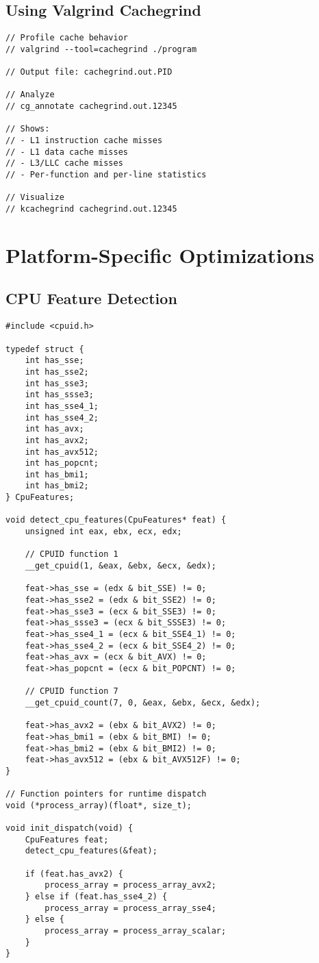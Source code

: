 \subsection{Using Valgrind Cachegrind}

\begin{lstlisting}
// Profile cache behavior
// valgrind --tool=cachegrind ./program

// Output file: cachegrind.out.PID

// Analyze
// cg_annotate cachegrind.out.12345

// Shows:
// - L1 instruction cache misses
// - L1 data cache misses
// - L3/LLC cache misses
// - Per-function and per-line statistics

// Visualize
// kcachegrind cachegrind.out.12345
\end{lstlisting}

\section{Platform-Specific Optimizations}

\subsection{CPU Feature Detection}

\begin{lstlisting}
#include <cpuid.h>

typedef struct {
    int has_sse;
    int has_sse2;
    int has_sse3;
    int has_ssse3;
    int has_sse4_1;
    int has_sse4_2;
    int has_avx;
    int has_avx2;
    int has_avx512;
    int has_popcnt;
    int has_bmi1;
    int has_bmi2;
} CpuFeatures;

void detect_cpu_features(CpuFeatures* feat) {
    unsigned int eax, ebx, ecx, edx;

    // CPUID function 1
    __get_cpuid(1, &eax, &ebx, &ecx, &edx);

    feat->has_sse = (edx & bit_SSE) != 0;
    feat->has_sse2 = (edx & bit_SSE2) != 0;
    feat->has_sse3 = (ecx & bit_SSE3) != 0;
    feat->has_ssse3 = (ecx & bit_SSSE3) != 0;
    feat->has_sse4_1 = (ecx & bit_SSE4_1) != 0;
    feat->has_sse4_2 = (ecx & bit_SSE4_2) != 0;
    feat->has_avx = (ecx & bit_AVX) != 0;
    feat->has_popcnt = (ecx & bit_POPCNT) != 0;

    // CPUID function 7
    __get_cpuid_count(7, 0, &eax, &ebx, &ecx, &edx);

    feat->has_avx2 = (ebx & bit_AVX2) != 0;
    feat->has_bmi1 = (ebx & bit_BMI) != 0;
    feat->has_bmi2 = (ebx & bit_BMI2) != 0;
    feat->has_avx512 = (ebx & bit_AVX512F) != 0;
}

// Function pointers for runtime dispatch
void (*process_array)(float*, size_t);

void init_dispatch(void) {
    CpuFeatures feat;
    detect_cpu_features(&feat);

    if (feat.has_avx2) {
        process_array = process_array_avx2;
    } else if (feat.has_sse4_2) {
        process_array = process_array_sse4;
    } else {
        process_array = process_array_scalar;
    }
}
\end{lstlisting}

